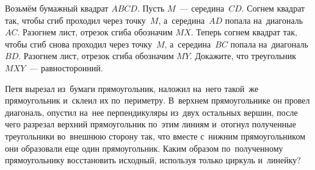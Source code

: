 \begin{problems}
\item
Возьмём бумажный квадрат $ABCD$.
Пусть $M$~--- середина~$CD$.
Согнем квадрат так, чтобы сгиб проходил через точку~$M$, а~середина~$AD$ попала
на~диагональ~$AC$.
Разогнем лист, отрезок сгиба обозначим $MX$.
Теперь согнем квадрат так, чтобы сгиб снова проходил через точку~$M$,
а~середина~$BC$ попала на~диагональ~$BD$.
Разогнем лист, отрезок сгиба обозначим $MY$.
Докажите, что треугольник $MXY$~--- равносторонний.

\item
Петя вырезал из~бумаги прямоугольник, наложил на~него такой~же прямоугольник
и~склеил их по~периметру.
В~верхнем прямоугольнике он провел диагональ, опустил на~нее перпендикуляры
из~двух остальных вершин, после чего разрезал верхний прямоугольник по~этим
линиям и~отогнул полученные треугольники во~внешнюю сторону так, что вместе
с~нижним прямоугольником они образовали еще один прямоугольник.
Каким образом по~полученному прямоугольнику восстановить исходный, используя
только циркуль и~линейку?

\end{problems}


